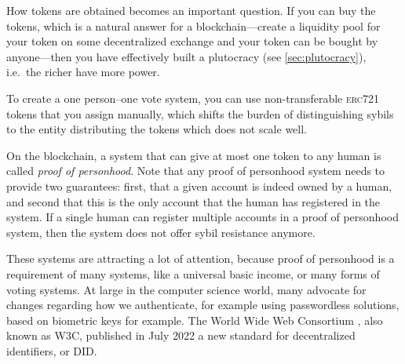 How tokens are obtained becomes an important question.
If you can buy the tokens, which is a natural answer for a blockchain---create a liquidity pool for your token on some decentralized exchange and your token can be bought by anyone---then you have effectively built a plutocracy (see \cref{sec:plutocracy}), i.e.\ the richer have more power.

To create a one person–one vote system, you can use non-transferable \textsc{erc721} tokens that you assign manually, which shifts the burden of distinguishing sybils to the entity distributing the tokens%
which does not scale well.

On the blockchain, a system that can give at most one token to any human is called \textit{proof of personhood}.
Note that any proof of personhood system needs to provide two guarantees: first, that a given account is indeed owned by a human, and second that this is the only account that the human has registered in the system.
If a single human can register multiple accounts in a proof of personhood system, then the system does not offer sybil resistance anymore.

These systems are attracting a lot of attention, because proof of personhood is a requirement of many systems, like a universal basic income, or many forms of voting systems.
At large in the computer science world, many advocate for changes regarding how we authenticate, for example using passwordless solutions, based on biometric keys for ex\-ample.
The World Wide Web Consortium%
, also known as W3C, published in July 2022 a new standard for decentralized identifiers, or DID.

